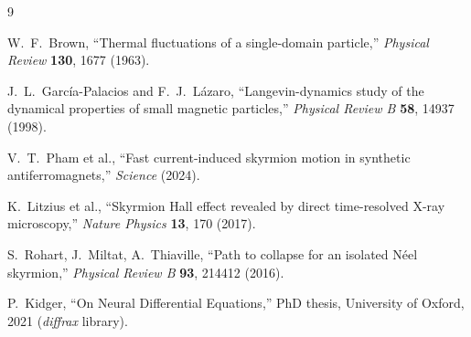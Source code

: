 \documentclass[11pt,a4paper]{article}
\begin{document}
\begin{thebibliography}{9}

W.~F.~Brown, ``Thermal fluctuations of a single-domain particle,''
\emph{Physical Review} \textbf{130}, 1677 (1963).

J.~L.~Garc\'ia-Palacios and F.~J.~L\'azaro,
``Langevin-dynamics study of the dynamical properties of small
magnetic particles,''
\emph{Physical Review B} \textbf{58}, 14937 (1998).

V.~T.~Pham et al., ``Fast current-induced skyrmion motion in
synthetic antiferromagnets,'' \emph{Science} (2024).

K.~Litzius et al., ``Skyrmion Hall effect revealed by direct
time-resolved X-ray microscopy,'' \emph{Nature Physics} \textbf{13},
170 (2017).

S.~Rohart, J.~Miltat, A.~Thiaville,
``Path to collapse for an isolated N\'eel skyrmion,''
\emph{Physical Review B} \textbf{93}, 214412 (2016).

P.~Kidger, ``On Neural Differential Equations,'' PhD thesis,
University of Oxford, 2021 (\emph{diffrax} library).

\end{thebibliography}
\end{document}
